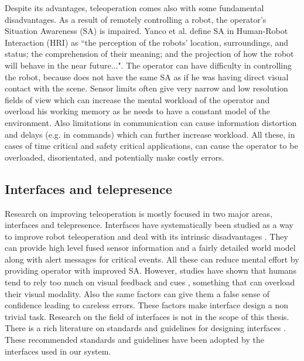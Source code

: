 \documentclass[a4paper,12pt,oneside,openright]{bhamthesis}
\begin{document}
Despite its advantages, teleoperation comes also with some fundamental disadvantages. As a result of remotely controlling a robot, the operator's Situation Awareness (SA) is impaired. Yanco et al. \cite{Yanco_HRI_SA_04} define SA in Human-Robot Interaction (HRI) as ``the perception of the robots' location, surroundings, and status; the comprehension of their meaning; and the projection of how the robot will behave in the near future...". The operator can have difficulty in controlling the robot, because does not have the same SA as if he was having direct visual contact with the scene. Sensor limits often give very narrow and low resolution fields of view which can increase the mental workload of the operator and overload his working memory as he needs to have a constant model of the environment. Also limitations in communication can cause information distortion and delays \cite{Hokayem2006} (e.g. in commands) which can further increase workload. All these, in cases of time critical and safety critical applications, can cause the operator to be overloaded, disorientated, and potentially make costly errors.

\subsection{Interfaces and telepresence}
Research on improving teleoperation is mostly focused in two major areas, interfaces and telepresence. Interfaces have systematically been studied as a way to improve robot teleoperation and deal with its intrinsic disadvantages \cite{Chen2007}. They can provide high level fused sensor information and a fairly detailed world model along with alert messages for critical events. All these can reduce mental effort by providing operator with improved SA. However, studies have shown that humans tend to rely too much on visual feedback and cues \cite{Yanco2006,Baker2004}, something that can overload their visual modality. Also the same factors can give them a false sense of confidence leading to careless errors. These factors make interface design a non trivial task. Research on the field of interfaces is not in the scope of this thesis. There is a rich literature on standards and guidelines for designing interfaces \cite{Yanco2004,Scholtz2004a,Nielsen2007a}. These recommended standards and guidelines have been adopted by the interfaces used in our system.
\end{document}

